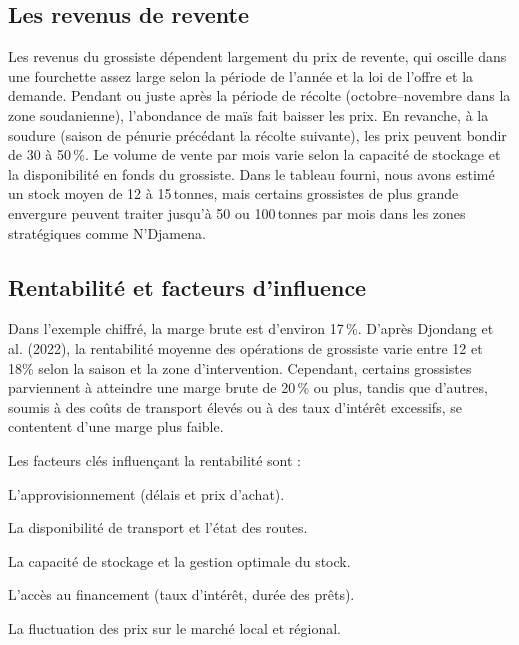 \documentclass[12pt,oneside]{report}
\begin{document}
\subsection{Les revenus de revente}
Les revenus du grossiste dépendent largement du prix de revente, qui oscille dans une fourchette assez large selon la période de l’année et la loi de l’offre et la demande. Pendant ou juste après la période de récolte (octobre–novembre dans la zone soudanienne), l’abondance de maïs fait baisser les prix. En revanche, à la soudure (saison de pénurie précédant la récolte suivante), les prix peuvent bondir de 30 à 50 \%. Le volume de vente par mois varie selon la capacité de stockage et la disponibilité en fonds du grossiste. Dans le tableau fourni, nous avons estimé un stock moyen de 12 à 15 tonnes, mais certains grossistes de plus grande envergure peuvent traiter jusqu’à 50 ou 100 tonnes par mois dans les zones stratégiques comme N’Djamena.

\subsection{Rentabilité et facteurs d’influence}
Dans l’exemple chiffré, la marge brute est d’environ 17 \%. D'après Djondang et al. (2022), la rentabilité moyenne des opérations de grossiste varie entre 12 et 18\% selon la saison et la zone d'intervention. Cependant, certains grossistes parviennent à atteindre une marge brute de 20 \% ou plus, tandis que d’autres, soumis à des coûts de transport élevés ou à des taux d’intérêt excessifs, se contentent d’une marge plus faible.

Les facteurs clés influençant la rentabilité sont :

L’approvisionnement (délais et prix d’achat).

La disponibilité de transport et l’état des routes.

La capacité de stockage et la gestion optimale du stock.

L’accès au financement (taux d’intérêt, durée des prêts).

La fluctuation des prix sur le marché local et régional.
\end{document}
